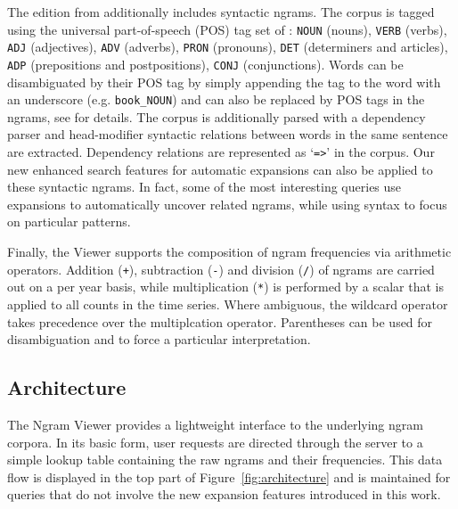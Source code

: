 \documentclass[11pt]{article}
\newcommand{\query}[1]{\texttt{#1}}
\begin{document}
The edition from  additionally includes syntactic ngrams. The corpus is tagged using the universal part-of-speech (POS) tag set of : \query{NOUN} (nouns), \query{VERB} (verbs), \query{ADJ} (adjectives), \query{ADV} (adverbs), \query{PRON} (pronouns), \query{DET} (determiners and articles), \query{ADP} (prepositions and postpositions), \query{CONJ} (conjunctions). Words can be disambiguated by their POS tag by simply appending the tag to the word with an underscore (e.g. \texttt{book\_NOUN}) and can also be replaced by POS tags in the ngrams, see  for details. The corpus is additionally parsed with a dependency parser and head-modifier syntactic relations between words in the same sentence are extracted. Dependency relations are represented as `\query{=>}' in the corpus. Our new enhanced search features for automatic expansions can also be applied to these syntactic ngrams. In fact, some of the most interesting queries use expansions to automatically uncover related ngrams, while using syntax to focus on particular patterns.

Finally, the Viewer supports the composition of ngram frequencies via arithmetic operators. Addition (\query{+}), subtraction (\query{-}) and division (\query{/}) of ngrams are carried out on a per year basis, while multiplication (\query{*}) is performed by a scalar that is applied to all counts in the time series. Where ambiguous, the wildcard operator takes precedence over the multiplcation operator. Parentheses can be used for disambiguation and to force a particular interpretation.



\subsection{Architecture}
The Ngram Viewer provides a lightweight interface to the underlying ngram corpora. In its basic form, user requests are directed through the server to a simple lookup table containing the raw ngrams and their frequencies. This data flow is displayed in the top part of Figure~\ref{fig:architecture} and is maintained for queries that do not involve the new expansion features introduced in this work.
\end{document}
